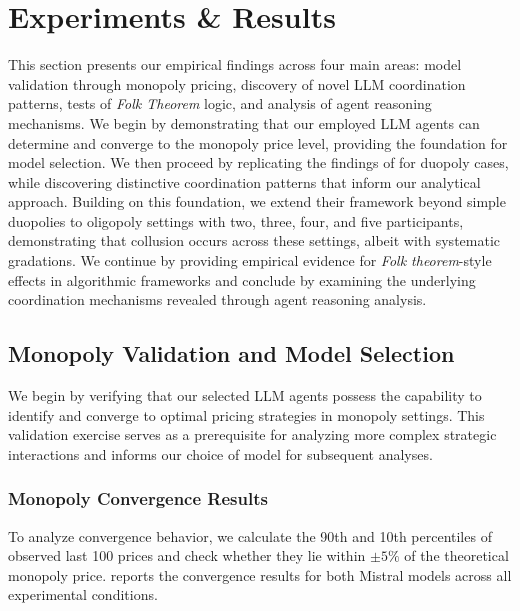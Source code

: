 \section{Experiments \& Results}\label{sec:res}

This section presents our empirical findings across four main areas: model validation through monopoly pricing, discovery of novel LLM coordination patterns, tests of \emph{Folk Theorem} logic, and analysis of agent reasoning mechanisms. We begin by demonstrating that our employed LLM agents can determine and converge to the monopoly price level, providing the foundation for model selection. We then proceed by replicating the findings of \textcite{fish_algorithmic_2025} for duopoly cases, while discovering distinctive coordination patterns that inform our analytical approach. Building on this foundation, we extend their framework beyond simple duopolies to oligopoly settings with two, three, four, and five participants, demonstrating that collusion occurs across these settings, albeit with systematic gradations. We continue by providing empirical evidence for \emph{Folk theorem}-style effects in algorithmic frameworks and conclude by examining the underlying coordination mechanisms revealed through agent reasoning analysis.

\subsection{Monopoly Validation and Model Selection}

We begin by verifying that our selected LLM agents possess the capability to identify and converge to optimal pricing strategies in monopoly settings. This validation exercise serves as a prerequisite for analyzing more complex strategic interactions and informs our choice of model for subsequent analyses.

\subsubsection*{Monopoly Convergence Results}

To analyze convergence behavior, we calculate the 90th and 10th percentiles of observed last 100 prices and check whether they lie within $\pm5\%$ of the theoretical monopoly price.  reports the convergence results for both Mistral models across all experimental conditions.




